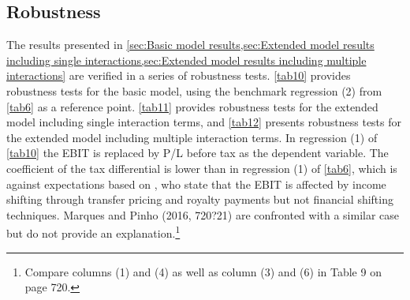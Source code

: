 \documentclass[10pt,twocolumn,oneside,cmyk]{article}
\begin{document}
\subsection{Robustness} \label{sec:Robustness}
The results presented in \cref{sec:Basic model results,sec:Extended model results including single interactions,sec:Extended model results including multiple interactions} are verified in a series of robustness tests. \cref{tab10} provides robustness tests for the basic model, using the benchmark regression (2) from \cref{tab6} as a reference point. \cref{tab11} provides robustness tests for the extended model including single interaction terms, and \cref{tab12} presents robustness tests for the extended model including multiple interaction terms. In regression (1) of \cref{tab10} the EBIT is replaced by P/L before tax as the dependent variable. The coefficient of the tax differential is lower than in regression (1) of \cref{tab6}, which is against expectations based on \textcite[10]{heckemeyer_multinationals_2013}, who state that the EBIT is affected by income shifting through transfer pricing and royalty payments but not financial shifting techniques. Marques and Pinho (2016, 720?21) are confronted with a similar case but do not provide an explanation.\footnote{Compare columns (1) and (4) as well as column (3) and (6) in Table 9 on page 720.}
\end{document}
